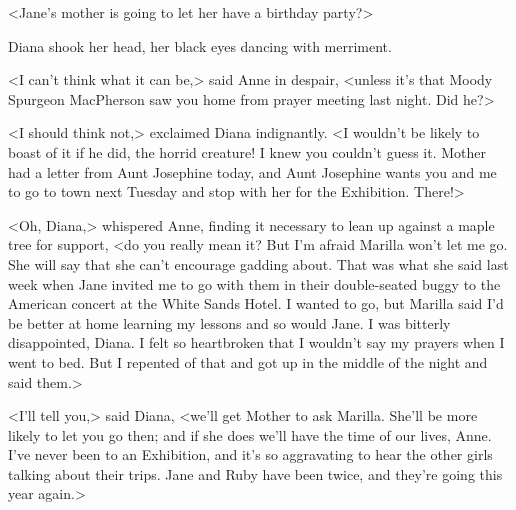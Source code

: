 <Jane's mother is going to let her have a birthday party?>

Diana shook her head, her black eyes dancing with merriment.

<I can't think what it can be,> said Anne in despair, <unless it's that Moody Spurgeon MacPherson saw you home from prayer meeting last night. Did he?>

<I should think not,> exclaimed Diana indignantly. <I wouldn't be likely to boast of it if he did, the horrid creature! I knew you couldn't guess it. Mother had a letter from Aunt Josephine today, and Aunt Josephine wants you and me to go to town next Tuesday and stop with her for the Exhibition. There!>

<Oh, Diana,> whispered Anne, finding it necessary to lean up against a maple tree for support, <do you really mean it? But I'm afraid Marilla won't let me go. She will say that she can't encourage gadding about. That was what she said last week when Jane invited me to go with them in their double-seated buggy to the American concert at the White Sands Hotel. I wanted to go, but Marilla said I'd be better at home learning my lessons and so would Jane. I was bitterly disappointed, Diana. I felt so heartbroken that I wouldn't say my prayers when I went to bed. But I repented of that and got up in the middle of the night and said them.>

<I'll tell you,> said Diana, <we'll get Mother to ask Marilla. She'll be more likely to let you go then; and if she does we'll have the time of our lives, Anne. I've never been to an Exhibition, and it's so aggravating to hear the other girls talking about their trips. Jane and Ruby have been twice, and they're going this year again.>

